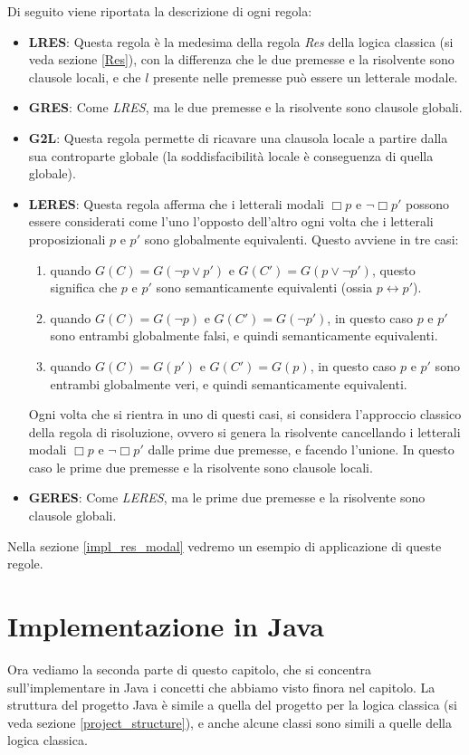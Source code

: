 \documentclass[a4paper,12pt]{report}
\newcommand{\tto} {\leftrightarrow}
\begin{document}
Di seguito viene riportata la descrizione di ogni regola:
\begin{itemize}
    \item \textbf{LRES}: Questa regola è la medesima della regola \emph{Res} della logica classica (si veda sezione \ref{Res}), con la differenza che le due premesse e la risolvente sono clausole locali, e che $l$ presente nelle premesse può essere un letterale modale.
    \item \textbf{GRES}: Come \emph{LRES}, ma le due premesse e la risolvente sono clausole globali.
    \item \textbf{G2L}: Questa regola permette di ricavare una clausola locale a partire dalla sua controparte globale (la soddisfacibilità locale è conseguenza di quella globale).
    \item \textbf{LERES}: Questa regola afferma che i letterali modali $\Box p$ e $\lnot \Box p'$ possono essere considerati come l'uno l'opposto dell'altro ogni volta che i letterali proposizionali $p$ e $p'$ sono globalmente equivalenti. Questo avviene in tre casi: \begin{enumerate}
        \item quando $G(C) = G(\lnot p \lor p')$ e $G(C') = G(p \lor \lnot p')$, questo significa che $p$ e $p'$ sono semanticamente equivalenti (ossia $p \tto p'$).
        \item quando $G(C) = G(\lnot p)$ e $G(C') = G(\lnot p')$, in questo caso $p$ e $p'$ sono entrambi globalmente falsi, e quindi semanticamente equivalenti.
        \item quando $G(C) = G(p')$ e $G(C') = G(p)$, in questo caso $p$ e $p'$ sono entrambi globalmente veri, e quindi semanticamente equivalenti.
    \end{enumerate}
    Ogni volta che si rientra in uno di questi casi, si considera l'approccio classico della regola di risoluzione, ovvero si genera la risolvente cancellando i letterali modali $\Box p$ e $\lnot \Box p'$ dalle prime due premesse, e facendo l'unione. In questo caso le prime due premesse e la risolvente sono clausole locali.
    \item \textbf{GERES}: Come \emph{LERES}, ma le prime due premesse e la risolvente sono clausole globali.
\end{itemize}
Nella sezione \ref{impl_res_modal} vedremo un esempio di applicazione di queste regole.

\section{Implementazione in Java}
Ora vediamo la seconda parte di questo capitolo, che si concentra sull'implementare in Java i concetti che abbiamo visto finora nel capitolo. La struttura del progetto Java è simile a quella del progetto per la logica classica (si veda sezione \ref{project_structure}), e anche alcune classi sono simili a quelle della logica classica.
\end{document}
